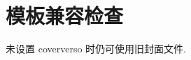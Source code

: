 \documentclass[fontsetup=font-setup-open,titlesetup=titles-setup,coverpage=work/template-legacy-cover,geometry=a4]{AJbook}
\begin{document}
\frontmatter
\mainmatter
\chapter{模板兼容检查}
未设置 coververso 时仍可使用旧封面文件.
\end{document}
